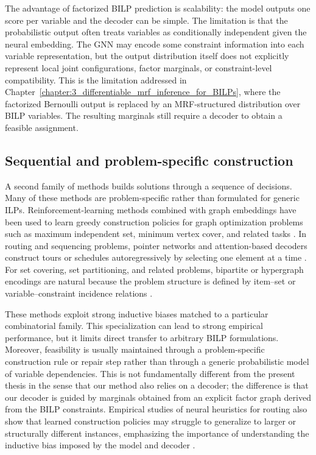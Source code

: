 The advantage of factorized BILP prediction is scalability: the model outputs one score per variable and the decoder can be simple. The limitation is that the probabilistic output often treats variables as conditionally independent given the neural embedding. The GNN may encode some constraint information into each variable representation, but the output distribution itself does not explicitly represent local joint configurations, factor marginals, or constraint-level compatibility. This is the limitation addressed in Chapter~\ref{chapter:3_differentiable_mrf_inference_for_BILPs}, where the factorized Bernoulli output is replaced by an MRF-structured distribution over BILP variables. The resulting marginals still require a decoder to obtain a feasible assignment.

\subsection{Sequential and problem-specific construction}
\label{subsec:rw_sequential_problem_specific}

A second family of methods builds solutions through a sequence of decisions. Many of these methods are problem-specific rather than formulated for generic ILPs. Reinforcement-learning methods combined with graph embeddings have been used to learn greedy construction policies for graph optimization problems such as maximum independent set, minimum vertex cover, and related tasks \cite{dai_learning_2017,li_combinatorial_2018}. In routing and sequencing problems, pointer networks and attention-based decoders construct tours or schedules autoregressively by selecting one element at a time \cite{vinyals_pointer_2015,kool_attention_2018}. For set covering, set partitioning, and related problems, bipartite or hypergraph encodings are natural because the problem structure is defined by item--set or variable--constraint incidence relations \cite{gasse_exact_2019}.

These methods exploit strong inductive biases matched to a particular combinatorial family. This specialization can lead to strong empirical performance, but it limits direct transfer to arbitrary BILP formulations. Moreover, feasibility is usually maintained through a problem-specific construction rule or repair step rather than through a generic probabilistic model of variable dependencies. This is not fundamentally different from the present thesis in the sense that our method also relies on a decoder; the difference is that our decoder is guided by marginals obtained from an explicit factor graph derived from the BILP constraints. Empirical studies of neural heuristics for routing also show that learned construction policies may struggle to generalize to larger or structurally different instances, emphasizing the importance of understanding the inductive bias imposed by the model and decoder \cite{joshi_learning_2021}.

